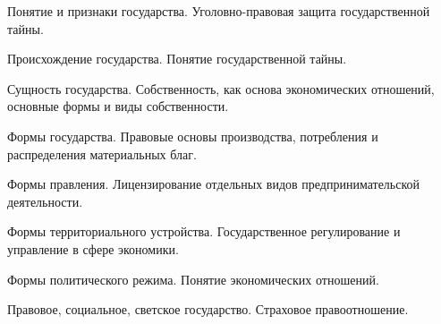 \documentclass[
	14pt,
	a4paper,
	]
	{scrartcl}
\begin{document}
\shapk
{}
\setcounter{zad}{0}

\vfill
\z Понятие и признаки государства.
 \vfill
\z Уголовно-правовая защита государственной тайны. \vfill

\vfill

\newpage


\shapk
{}
\setcounter{zad}{0}

\vfill
\z Происхождение государства.
 \vfill
\z Понятие государственной тайны.
 \vfill

\vfill

\newpage


\shapk
{}
\setcounter{zad}{0}

\vfill
\z Сущность государства.
 \vfill
\z Собственность, как основа экономических отношений, основные формы и виды собственности.
 \vfill

\vfill

\newpage


\shapk
{}
\setcounter{zad}{0}

\vfill
\z Формы государства.
 \vfill
\z Правовые основы производства, потребления и распределения материальных благ.
 \vfill

\vfill

\newpage


\shapk
{}
\setcounter{zad}{0}

\vfill
\z Формы правления.
 \vfill
\z Лицензирование отдельных видов предпринимательской деятельности.
 \vfill

\vfill

\newpage


\shapk
{}
\setcounter{zad}{0}

\vfill
\z Формы территориального устройства.
 \vfill
\z Государственное регулирование и управление в сфере экономики.
 \vfill

\vfill

\newpage


\shapk
{}
\setcounter{zad}{0}

\vfill
\z Формы политического режима. 
 \vfill
\z Понятие экономических отношений. 
 \vfill

\vfill

\newpage


\shapk
{}
\setcounter{zad}{0}

\vfill
\z Правовое, социальное, светское государство.
 \vfill
\z Страховое правоотношение.
 \vfill
\end{document}
